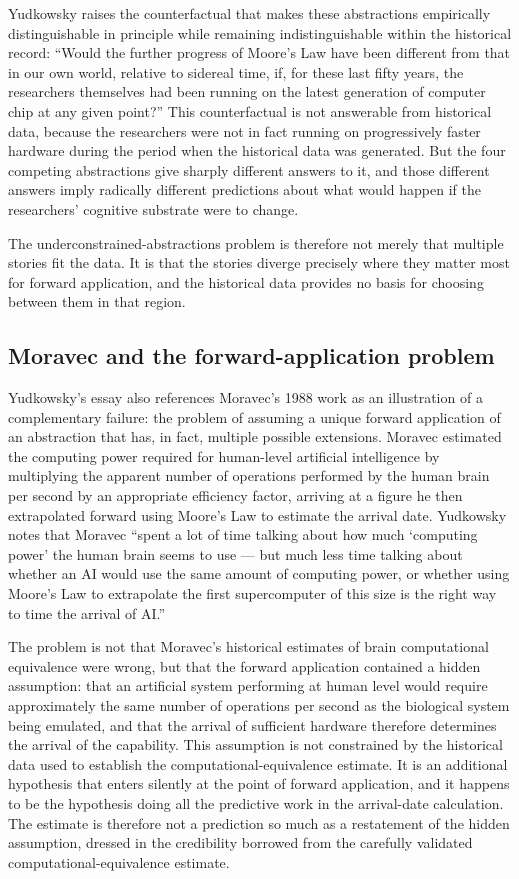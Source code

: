 \documentclass[12pt, a4paper]{article}
\theoremstyle{plain}
\theoremstyle{definition}
\theoremstyle{remark}
\begin{document}
Yudkowsky raises the counterfactual that makes these abstractions empirically
distinguishable in principle while remaining indistinguishable within the historical
record: ``Would the further progress of Moore's Law have been different from that in
our own world, relative to sidereal time, if, for these last fifty years, the
researchers themselves had been running on the latest generation of computer chip at
any given point?''
This counterfactual is not answerable from historical data, because the researchers
were not in fact running on progressively faster hardware during the period when the
historical data was generated.
But the four competing abstractions give sharply different answers to it, and those
different answers imply radically different predictions about what would happen if
the researchers' cognitive substrate were to change.

The underconstrained-abstractions problem is therefore not merely that multiple stories
fit the data.
It is that the stories diverge precisely where they matter most for forward application,
and the historical data provides no basis for choosing between them in that region.

\subsection{Moravec and the forward-application problem}

Yudkowsky's essay also references Moravec's 1988 work as an illustration of a
complementary failure: the problem of assuming a unique forward application of an
abstraction that has, in fact, multiple possible extensions.
Moravec estimated the computing power required for human-level artificial intelligence
by multiplying the apparent number of operations performed by the human brain per second
by an appropriate efficiency factor, arriving at a figure he then extrapolated forward
using Moore's Law to estimate the arrival date.
Yudkowsky notes that Moravec ``spent a lot of time talking about how much `computing
power' the human brain seems to use --- but much less time talking about whether an AI
would use the same amount of computing power, or whether using Moore's Law to
extrapolate the first supercomputer of this size is the right way to time the arrival
of AI.''

The problem is not that Moravec's historical estimates of brain computational
equivalence were wrong, but that the forward application contained a hidden assumption:
that an artificial system performing at human level would require approximately the
same number of operations per second as the biological system being emulated, and that
the arrival of sufficient hardware therefore determines the arrival of the capability.
This assumption is not constrained by the historical data used to establish the
computational-equivalence estimate.
It is an additional hypothesis that enters silently at the point of forward application,
and it happens to be the hypothesis doing all the predictive work in the arrival-date
calculation.
The estimate is therefore not a prediction so much as a restatement of the hidden
assumption, dressed in the credibility borrowed from the carefully validated
computational-equivalence estimate.
\end{document}
